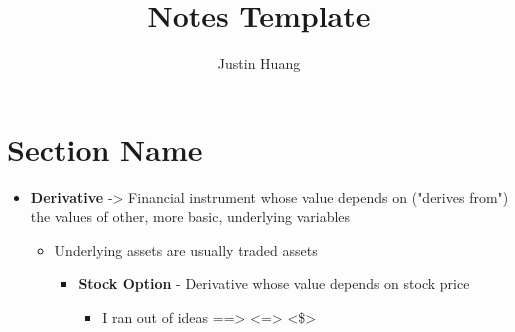 \documentclass[11pt, letterpaper]{template}
\title{Notes Template}
\author{Justin Huang}
\begin{document}
\maketitle

\section{Section Name}

\begin{itemize}
	\item \textbf{Derivative} -\textgreater{} Financial instrument whose value depends on ("derives from") the values of other, more basic, underlying variables
	\begin{itemize}
		\item Underlying assets are usually traded assets
		\begin{itemize}
			\item \textbf{Stock Option} - Derivative whose value depends on stock price
			\begin{itemize}
				\item I ran out of ideas ==> <=> <\$>
			\end{itemize}
		\end{itemize}
	\end{itemize}
\end{itemize}
\end{document}

